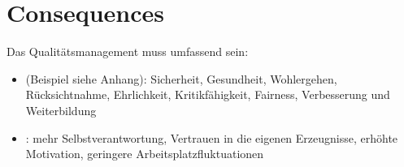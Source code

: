 \section{Consequences}
Das Qualitätsmanagement muss umfassend sein: %
\begin{itemize}
\item {}
   (Beispiel siehe Anhang):
  Sicherheit, Gesundheit, Wohlergehen, Rücksichtnahme, Ehrlichkeit,
  Kritikfähigkeit, Fairness, Ver\-bes\-se\-rung und Weiterbildung
\item {}:
 mehr Selbstverantwortung,
 Vertrauen in die eigenen
 Erzeugnisse, erh\"ohte Motivation, geringere Arbeitsplatzfluktuationen\\
\end{itemize}
\ifslides
\newpage
\fi
%
%
%
%
%
